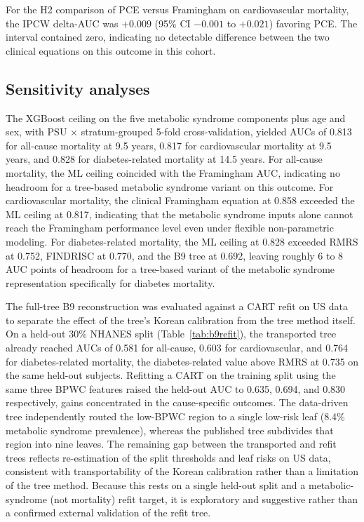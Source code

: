 \documentclass[11pt]{article}
\begin{document}
For the H2 comparison of PCE versus Framingham on cardiovascular mortality, the IPCW delta-AUC was $+0.009$ (95\% CI $-0.001$ to $+0.021$) favoring PCE. The interval contained zero, indicating no detectable difference between the two clinical equations on this outcome in this cohort.

\subsection*{Sensitivity analyses}

The XGBoost ceiling on the five metabolic syndrome components plus age and sex, with PSU $\times$ stratum-grouped 5-fold cross-validation, yielded AUCs of 0.813 for all-cause mortality at 9.5 years, 0.817 for cardiovascular mortality at 9.5 years, and 0.828 for diabetes-related mortality at 14.5 years. For all-cause mortality, the ML ceiling coincided with the Framingham AUC, indicating no headroom for a tree-based metabolic syndrome variant on this outcome. For cardiovascular mortality, the clinical Framingham equation at 0.858 exceeded the ML ceiling at 0.817, indicating that the metabolic syndrome inputs alone cannot reach the Framingham performance level even under flexible non-parametric modeling. For diabetes-related mortality, the ML ceiling at 0.828 exceeded RMRS at 0.752, FINDRISC at 0.770, and the B9 tree at 0.692, leaving roughly 6 to 8 AUC points of headroom for a tree-based variant of the metabolic syndrome representation specifically for diabetes mortality.

The full-tree B9 reconstruction was evaluated against a CART refit on US data to separate the effect of the tree's Korean calibration from the tree method itself. On a held-out 30\% NHANES split (Table~\ref{tab:b9refit}), the transported tree already reached AUCs of 0.581 for all-cause, 0.603 for cardiovascular, and 0.764 for diabetes-related mortality, the diabetes-related value above RMRS at 0.735 on the same held-out subjects. Refitting a CART on the training split using the same three BPWC features raised the held-out AUC to 0.635, 0.694, and 0.830 respectively, gains concentrated in the cause-specific outcomes. The data-driven tree independently routed the low-BPWC region to a single low-risk leaf (8.4\% metabolic syndrome prevalence), whereas the published tree subdivides that region into nine leaves. The remaining gap between the transported and refit trees reflects re-estimation of the split thresholds and leaf risks on US data, consistent with transportability of the Korean calibration rather than a limitation of the tree method. Because this rests on a single held-out split and a metabolic-syndrome (not mortality) refit target, it is exploratory and suggestive rather than a confirmed external validation of the refit tree.
\end{document}
